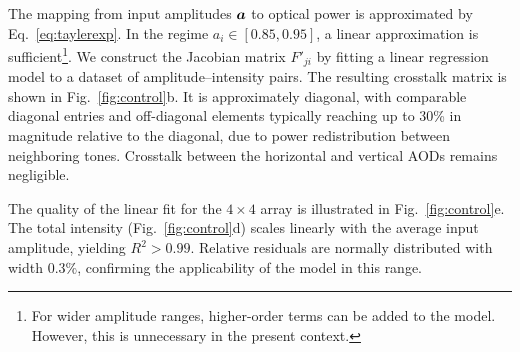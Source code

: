 The mapping from input amplitudes $\boldsymbol{a}$ to optical power is approximated by Eq.~\eqref{eq:taylerexp}. In the regime $a_i \in [0.85, 0.95]$, a linear approximation is sufficient\footnote{
    For wider amplitude ranges, higher-order terms can be added to the model. However, this is unnecessary in the present context.
}. We construct the Jacobian matrix $F'_{ji}$ by fitting a linear regression model to a dataset of amplitude–intensity pairs. The resulting crosstalk matrix is shown in Fig.~\ref{fig:control}b. It is approximately diagonal, with comparable diagonal entries and off-diagonal elements typically reaching up to 30\% in magnitude relative to the diagonal, due to power redistribution between neighboring tones. Crosstalk between the horizontal and vertical AODs remains negligible.

The quality of the linear fit for the $4 \times 4$ array is illustrated in Fig.~\ref{fig:control}e. The total intensity (Fig.~\ref{fig:control}d) scales linearly with the average input amplitude, yielding $R^2 > 0.99$. Relative residuals are normally distributed with width $0.3\%$, confirming the applicability of the model in this range.



